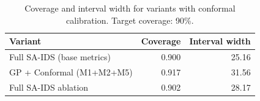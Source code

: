 \begin{table}[ht]
\centering
\caption{Coverage and interval width for variants with conformal calibration.
         Target coverage: 90\%.}
\label{tab:coverage}
\begin{tabular}{lrr}
\toprule
Variant & Coverage & Interval width \\
\midrule
Full SA-IDS (base metrics) & 0.900 & 25.16 \\
GP + Conformal (M1+M2+M5) & 0.917 & 31.56 \\
Full SA-IDS ablation & 0.902 & 28.17 \\
\bottomrule
\end{tabular}
\end{table}
